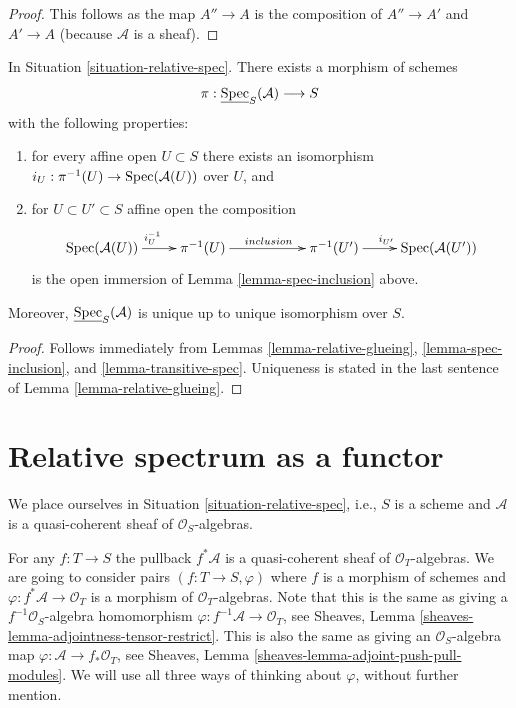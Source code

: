 \begin{proof}
This follows as the map $A'' \to A$ is the composition of $A'' \to A'$ and
$A' \to A$ (because $\mathcal{A}$ is a sheaf).
\end{proof}

\begin{lemma}
\label{lemma-glue-relative-spec}
In Situation \ref{situation-relative-spec}.
There exists a morphism of schemes
$$
\pi : \underline{\mathop{\mathrm{Spec}}}_S(\mathcal{A}) \longrightarrow S
$$
with the following properties:
\begin{enumerate}
\item for every affine open $U \subset S$ there exists an isomorphism
$i_U : \pi^{-1}(U) \to \mathop{\mathrm{Spec}}(\mathcal{A}(U))$ over $U$, and
\item for $U \subset U' \subset S$ affine open the composition
$$
\xymatrix{
\Spec(\mathcal{A}(U)) \ar[r]^{i_U^{-1}} &
\pi^{-1}(U) \ar[rr]^{inclusion} & &
\pi^{-1}(U') \ar[r]^{i_{U'}} &
\Spec(\mathcal{A}(U'))
}
$$
is the open immersion of Lemma \ref{lemma-spec-inclusion} above.
\end{enumerate}
Moreover, $\underline{\mathop{\mathrm{Spec}}}_S(\mathcal{A})$
is unique up to unique isomorphism over $S$.
\end{lemma}

\begin{proof}
Follows immediately from
Lemmas \ref{lemma-relative-glueing},
\ref{lemma-spec-inclusion}, and
\ref{lemma-transitive-spec}.
Uniqueness is stated in the last sentence of
Lemma \ref{lemma-relative-glueing}.
\end{proof}












\section{Relative spectrum as a functor}
\label{section-spec}

\noindent
We place ourselves in Situation \ref{situation-relative-spec}, i.e.,
$S$ is a scheme and $\mathcal{A}$ is a quasi-coherent sheaf of
$\mathcal{O}_S$-algebras.

\medskip\noindent
For any $f : T \to S$ the pullback
$f^*\mathcal{A}$ is a quasi-coherent sheaf of $\mathcal{O}_T$-algebras.
We are going to consider pairs $(f : T \to S, \varphi)$ where
$f$ is a morphism of schemes and $\varphi : f^*\mathcal{A} \to \mathcal{O}_T$
is a morphism of $\mathcal{O}_T$-algebras. Note that this is the
same as giving a $f^{-1}\mathcal{O}_S$-algebra homomorphism
$\varphi : f^{-1}\mathcal{A} \to \mathcal{O}_T$, see
Sheaves, Lemma \ref{sheaves-lemma-adjointness-tensor-restrict}.
This is also the same as giving an $\mathcal{O}_S$-algebra map
$\varphi : \mathcal{A} \to f_*\mathcal{O}_T$, see
Sheaves, Lemma \ref{sheaves-lemma-adjoint-push-pull-modules}.
We will use all three ways of thinking about $\varphi$,
without further mention.

